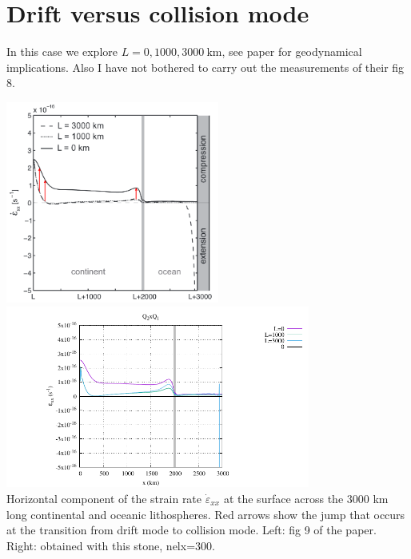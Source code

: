 \newpage
\section*{Drift versus collision mode}

In this case we explore $L=0,1000,3000~\si{\km}$, see paper for geodynamical 
implications. Also I have not bothered to carry out the measurements of their fig 8.

\begin{center}
\includegraphics[width=7cm]{python_codes/fieldstone_143/images/fig9}
\includegraphics[width=10cm]{python_codes/fieldstone_143/results/fig9/fig9}\\
{\captionfont Horizontal component of the strain rate $\dot{\varepsilon}_{xx}$ at
the surface across the 3000 km long continental and oceanic
lithospheres. Red arrows show the jump that occurs at the
transition from drift mode to collision mode.
Left: fig 9 of the paper. Right: obtained with this stone, nelx=300.}
\end{center}



